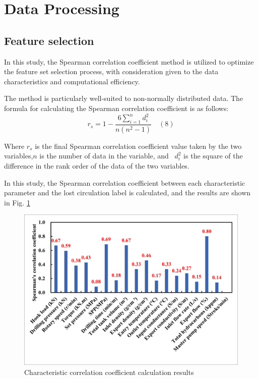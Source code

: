 \documentclass[journal,article,submit,pdftex,moreauthors]{Definitions/mdpi}
\begin{document}
\section{Data Processing}
\subsection{Feature selection}

In this study, the Spearman correlation coefficient method is utilized to optimize the feature set selection process, with consideration given to the data characteristics and computational efficiency.

The method is particularly well-suited to non-normally distributed data. The formula for calculating the Spearman correlation coefficient is as follows:
\[{{r}_{s}}=1-\frac{6\sum\limits_{i=1}^{n}{d_{i}^{2}}}{n\left( {{n}^{2}}-1 \right)}\quad (8)\]

Where \({{r}_{s}}\) is the final Spearman correlation coefficient value taken by the two variables,\(n\) is the number of data in the variable, and  \(d_{i}^{2}\) is the square of the difference in the rank order of the data of the two variables.


In this study, the Spearman correlation coefficient between each characteristic parameter and the lost circulation label is calculated, and the results are shown in Fig. \ref{fig:Characteristic correlation coefficient calculation results}

\begin{figure}[H]
    \centering
    \includegraphics[width=0.75\linewidth]{图片/spearman.png}
    \caption{Characteristic correlation coefficient calculation results}
    \label{fig:Characteristic correlation coefficient calculation results}
\end{figure}
\end{document}
